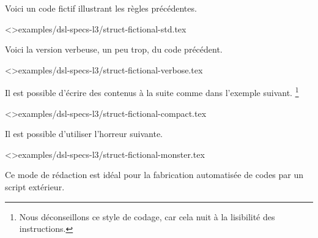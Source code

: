 \documentclass{tutodoc}
\begin{document}


\medskip


Voici un code fictif illustrant les règles précédentes.

\tdoclatexinput<>{examples/dsl-specs-l3/struct-fictional-std.tex}


Voici la version verbeuse, un peu trop, du code précédent.

\tdoclatexinput<>{examples/dsl-specs-l3/struct-fictional-verbose.tex}


Il est possible d'écrire des contenus à la suite comme dans l'exemple suivant.%
\footnote{
    Nous déconseillons ce style de codage, car cela nuit à la lisibilité des instructions.
}

\tdoclatexinput<>{examples/dsl-specs-l3/struct-fictional-compact.tex}


\begin{tdocnote}
	Il est possible d'utiliser l'horreur suivante.

	\tdoclatexinput<>{examples/dsl-specs-l3/struct-fictional-monster.tex}
	
	Ce mode de rédaction est idéal pour la fabrication automatisée de codes par un script extérieur.
\end{tdocnote}
\end{document}
